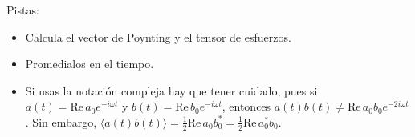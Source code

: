 \documentclass{exam}
\begin{document}
\begin{questions}

  Pistas:
  \begin{itemize}
  \item Calcula el vector de Poynting y el tensor de esfuerzos.
  \item Promedialos en el tiempo.
  \item Si usas la notación compleja hay que tener cuidado, pues si
    $a(t)=\text{Re}\, a_0 e^{-i\omega t}$
    y $b(t)=\text{Re}\, b_0 e^{-i\omega t}$, entonces $a(t)b(t)\ne
    \text{Re}\, a_0 b_0 e^{-2i\omega t}$. Sin embargo, $\langle a(t)
    b(t)\rangle = \frac{1}{2}\text{Re}\, a_0 b_0^*=\frac{1}{2}\text{Re}\, a_0^* b_0$.

  \end{itemize}



\end{questions}
\end{document}
